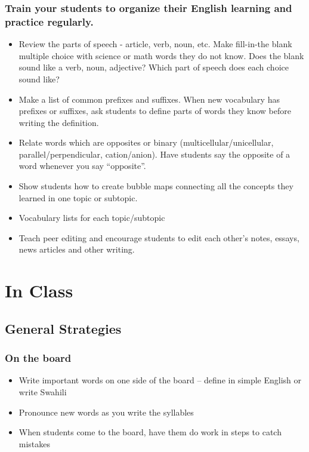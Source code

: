 \documentclass[12pt,a4paper]{report}
\begin{document}
\subsubsection{Train your students to organize their English learning and practice regularly.}
\begin{itemize}
\item{Review the parts of speech - article, verb, noun, etc. Make fill-in-the blank multiple choice with science or math words they do not know. Does the blank sound like a verb, noun, adjective? Which part of speech does each choice sound like?}

\item{Make a list of common prefixes and suffixes. When new vocabulary has prefixes or suffixes, ask students to define parts of words they know before writing the definition.}

\item{Relate words which are opposites or binary (multicellular/unicellular, parallel/perpendicular, cation/anion). Have students say the opposite of a word whenever you say “opposite”.}

\item{Show students how to create bubble maps connecting all the concepts they learned in one topic or subtopic.}

\item{Vocabulary lists for each topic/subtopic}

\item{Teach peer editing and encourage students to edit each other’s notes, essays, news articles and other writing.}

\end{itemize}

\section{In Class}

\subsection{General Strategies}

\subsubsection{On the board}
\begin{itemize}
\item{Write important words on one side of the board – define in simple English or write Swahili}

\item{Pronounce new words as you write the syllables}

\item{When students come to the board, have them do work in steps to catch mistakes}
\end{itemize}
\end{document}
